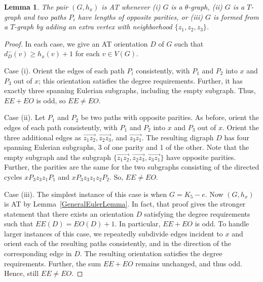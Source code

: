 \documentclass[12pt]{article}
\theoremstyle{plain}
\newtheorem{lem}[thm]{Lemma}
\theoremstyle{definition}
\theoremstyle{remark}
\renewcommand{\vec}{\overrightarrow}
\begin{document}
	\begin{lem}
		\label{ThetaReducible}
		\label{TgraphReducible}
		\label{T+graphReducible}
		The pair $(G,h_x)$ is AT whenever (i) $G$ is a $\theta$-graph, (ii) $G$ is a
		$T$-graph and two paths $P_i$ have lengths of opposite parities, or (iii) $G$ is
		formed from a $T$-graph by adding an extra vertex with neighborhood
		$\{z_1,z_2,z_3\}$.
	\end{lem}
	\begin{proof}
		In each case, we give an AT orientation $D$ of $G$ such that $d_D^-(v)\ge
		h_x(v)+1$ for each $v\in V(G)$.
		
		Case (i).  Orient the edges of each path $P_i$ consistently, with $P_1$ and
		$P_2$ into $x$ and $P_3$ out of $x$; this orientation satisfies the degree
		requirements.  Further, it has exactly three spanning Eulerian subgraphs,
		including the empty subgraph.  Thus, $EE+EO$ is odd, so $EE\ne EO$.
		
		Case (ii).  Let $P_1$ and $P_2$ be two paths with opposite parities.  As before,
		orient the edges of each path consistently, with $P_1$ and $P_2$ into $x$ and
		$P_3$ out of $x$.  Orient the three additional edges as $\vec{z_1z_2},
		\vec{z_2z_3}$, and $\vec{z_3z_1}$.  The resulting digraph $D$ has four spanning
		Eulerian subgraphs, 3 of one parity and 1 of the other.  Note that the empty
		subgraph and the subgraph $\{\vec{z_1z_2}, \vec{z_2z_3}, \vec{z_3z_1}\}$ have
		opposite parities.  Further, the parities are the same for the two subgraphs
		consisting of the directed cycles $xP_3z_3z_1P_1$ and $xP_3z_3z_1z_2P_2$.  So,
		$EE\ne EO$.
		
		Case (iii).  The simplest instance of this case is when $G=K_5-e$.  Now
		$(G,h_x)$ is AT by Lemma~\ref{GeneralEulerLemma}.  In fact, that proof gives the
		stronger statement that there exists an orientation $D$ satisfying the degree
		requirements such that $EE(D)=EO(D)+1$.  In particular, $EE+EO$ is odd.
		To handle larger instances of this case, we repeatedly subdivide edges incident
		to $x$ and orient each of the resulting paths consistently, and in the direction
		of the corresponding edge in $D$.  The resulting orientation satisfies the
		degree requirements.  Further, the sum $EE+EO$ remains unchanged, and thus odd.
		Hence, still $EE\ne EO$.
	\end{proof}
	
\end{document}

